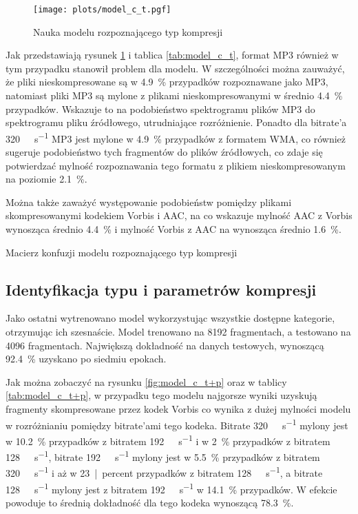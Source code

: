 \documentclass[pl,12pt]{aghdpl}
\let\Oldsubsection\subsection%
\renewcommand{\subsection}{\FloatBarrier\Oldsubsection}
\begin{document}
\begin{figure}[!tbh]
  \centering
  \texttt{[image: plots/model\_c\_t.pgf]}
  \caption{Nauka modelu rozpoznającego typ kompresji}
  \label{fig:model_c_t}
\end{figure}

Jak przedstawiają rysunek \ref{fig:model_c_t} i tablica \ref{tab:model_c_t},
format MP3 również w tym przypadku stanowił problem dla modelu. W szczególności
można zauważyć, że pliki nieskompresowane są w \SI{4.9}{\percent} przypadków
rozpoznawane jako MP3, natomiast pliki MP3 są mylone z plikami
nieskompresowanymi w średnio \SI{4.4}{\percent} przypadków. Wskazuje to na
podobieństwo spektrogramu plików MP3 do spektrogramu pliku źródłowego,
utrudniające rozróżnienie. Ponadto dla bitrate'a \SI{320}{\kibi\bit\per\second}
MP3 jest mylone w \SI{4.9}{\percent} przypadków z formatem WMA, co również
sugeruje podobieństwo tych fragmentów do plików źródłowych, co zdaje się
potwierdzać mylność rozpoznawania tego formatu z plikiem nieskompresowanym na
poziomie \SI{2.1}{\percent}.

Można także zaważyć występowanie podobieństw pomiędzy plikami skompresowanymi
kodekiem Vorbis i AAC, na co wskazuje mylność AAC z Vorbis wynosząca średnio
\SI{4.4}{\percent} i mylność Vorbis z AAC na wynosząca średnio
\SI{1.6}{\percent}.
\begin{table}[!tbh]
  \centering
  \caption{Macierz konfuzji modelu rozpoznającego typ kompresji}
  
  \label{tab:model_c_t}
\end{table}
\subsection{Identyfikacja typu i parametrów kompresji}
Jako ostatni wytrenowano model wykorzystując wszystkie dostępne kategorie,
otrzymując ich szesnaście. Model trenowano na 8192 fragmentach, a testowano na
4096 fragmentach. Największą dokładność na danych testowych, wynoszącą
\SI{92.4}{\percent} uzyskano po siedmiu epokach.

Jak można zobaczyć na rysunku \ref{fig:model_c_t+p} oraz w tablicy
\ref{tab:model_c_t+p}, w przypadku tego modelu najgorsze wyniki uzyskują
fragmenty skompresowane przez kodek Vorbis co wynika z dużej mylności modelu w
rozróżnianiu pomiędzy bitrate'ami tego kodeka. Bitrate
\SI{320}{\kibi\bit\per\second} mylony jest w \SI{10.2}{\percent} przypadków z
bitratem \SI{192}{\kibi\bit\per\second} i w \SI{2}{\percent} przypadków z
bitratem \SI{128}{\kibi\bit\per\second}, bitrate \SI{192}{\kibi\bit\per\second}
mylony jest w \SI{5.5}{\percent} przypadków z bitratem
\SI{320}{\kibi\bit\per\second} i aż w \SI{23}{|percent} przypadków z bitratem
\SI{128}{\kibi\bit\per\second}, a bitrate \SI{128}{\kibi\bit\per\second} mylony
jest z bitratem \SI{192}{\kibi\bit\per\second} w \SI{14.1}{\percent}
przypadków. W efekcie powoduje to średnią dokładność dla tego kodeka
wynoszącą \SI{78.3}{\percent}.
\end{document}
